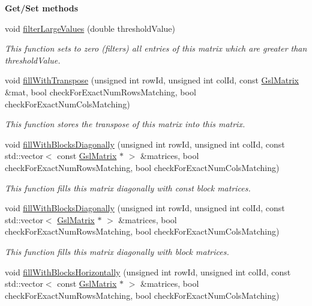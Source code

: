 \begin{Indent}{\bf Get/\-Set methods}
\begin{DoxyCompactItemize}
void \hyperlink{class_q_u_e_s_o_1_1_gsl_matrix_a49966d9d3c41d7f5b4ea8b3d9150e96f}{filter\-Large\-Values} (double threshold\-Value)
\begin{DoxyCompactList}\small\item\em This function sets to zero (filters) all entries of {\ttfamily this} matrix which are greater than {\ttfamily threshold\-Value}. \end{DoxyCompactList}\item 
void \hyperlink{class_q_u_e_s_o_1_1_gsl_matrix_ae1ab7bd92040d7b65b67a33958f00ad1}{fill\-With\-Transpose} (unsigned int row\-Id, unsigned int col\-Id, const \hyperlink{class_q_u_e_s_o_1_1_gsl_matrix}{Gsl\-Matrix} \&mat, bool check\-For\-Exact\-Num\-Rows\-Matching, bool check\-For\-Exact\-Num\-Cols\-Matching)
\begin{DoxyCompactList}\small\item\em This function stores the transpose of {\ttfamily this} matrix into {\ttfamily this} matrix. \end{DoxyCompactList}\item 
void \hyperlink{class_q_u_e_s_o_1_1_gsl_matrix_a9c182fc0a4ed7a6f6c41bf6b1460bf59}{fill\-With\-Blocks\-Diagonally} (unsigned int row\-Id, unsigned int col\-Id, const std\-::vector$<$ const \hyperlink{class_q_u_e_s_o_1_1_gsl_matrix}{Gsl\-Matrix} $\ast$ $>$ \&matrices, bool check\-For\-Exact\-Num\-Rows\-Matching, bool check\-For\-Exact\-Num\-Cols\-Matching)
\begin{DoxyCompactList}\small\item\em This function fills {\ttfamily this} matrix diagonally with const block matrices. \end{DoxyCompactList}\item 
void \hyperlink{class_q_u_e_s_o_1_1_gsl_matrix_a0f37abb7334bc739f509d8ff6fc382f1}{fill\-With\-Blocks\-Diagonally} (unsigned int row\-Id, unsigned int col\-Id, const std\-::vector$<$ \hyperlink{class_q_u_e_s_o_1_1_gsl_matrix}{Gsl\-Matrix} $\ast$ $>$ \&matrices, bool check\-For\-Exact\-Num\-Rows\-Matching, bool check\-For\-Exact\-Num\-Cols\-Matching)
\begin{DoxyCompactList}\small\item\em This function fills {\ttfamily this} matrix diagonally with block matrices. \end{DoxyCompactList}\item 
void \hyperlink{class_q_u_e_s_o_1_1_gsl_matrix_a66a9da48f05e3ef4ce386cedcc25fa39}{fill\-With\-Blocks\-Horizontally} (unsigned int row\-Id, unsigned int col\-Id, const std\-::vector$<$ const \hyperlink{class_q_u_e_s_o_1_1_gsl_matrix}{Gsl\-Matrix} $\ast$ $>$ \&matrices, bool check\-For\-Exact\-Num\-Rows\-Matching, bool check\-For\-Exact\-Num\-Cols\-Matching)

\end{DoxyCompactItemize}
\end{Indent}
